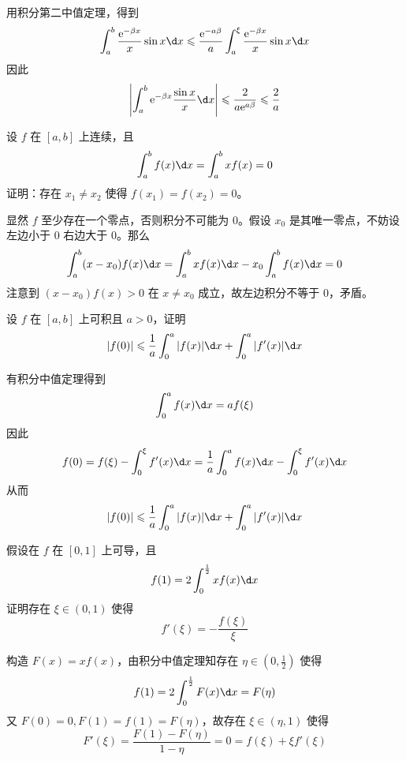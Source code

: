 \begin{solution}
	用积分第二中值定理，得到
	\[ \int_{a}^{b} \frac{\ee^{-\beta x}}{x} \sin x \d x \leqslant \frac{\ee^{-a \beta}}{a} \int_{a}^{\xi} \frac{\ee^{-\beta x}}{x} \sin x \d x \]
	因此
	\[ \left| \int_{a}^{b} \ee^{-\beta x} \frac{\sin x}{x} \d x \right| \leqslant \frac{2}{a \ee^{a \beta}} \leqslant \frac{2}{a} \]
\end{solution}

\begin{problem}[000045]
设 $f$ 在 $[a, b]$ 上连续，且
\[ \int_{a}^{b} f(x) \d x = \int_{a}^{b} x f(x) = 0 \]
证明：存在 $x_1 \neq x_2$ 使得 $f(x_1) = f(x_2) = 0$。
\end{problem}

\begin{solution}
	显然 $f$ 至少存在一个零点，否则积分不可能为 $0$。假设 $x_0$ 是其唯一零点，不妨设左边小于 $0$ 右边大于 $0$。那么
	\[ \int_{a}^{b} (x - x_0) f(x) \d x = \int_{a}^{b} x f(x) \d x - x_0 \int_{a}^{b} f(x) \d x = 0 \]
	注意到 $(x - x_0) f(x) > 0$ 在 $x \neq x_0$ 成立，故左边积分不等于 $0$，矛盾。
\end{solution}

\begin{problem}[000046]
设 $f$ 在 $[a, b]$ 上可积且 $a > 0$，证明
\[ |f(0)| \leqslant \frac{1}{a} \int_{0}^{a} |f(x)| \d x + \int_{0}^{a} |f'(x)| \d x \]
\end{problem}

\begin{solution}
	有积分中值定理得到
	\[ \int_{0}^{a} f(x) \d x = a f(\xi) \]
	因此
	\[ f(0) = f(\xi) - \int_{0}^{\xi} f'(x) \d x = \frac{1}{a} \int_{0}^{a} f(x) \d x - \int_{0}^{\xi} f'(x) \d x \]
	从而
	\[ |f(0)| \leqslant \frac{1}{a} \int_{0}^{a} |f(x)| \d x + \int_{0}^{a} |f'(x)| \d x \]
\end{solution}

\begin{problem}[000047]
假设在 $f$ 在 $[0, 1]$ 上可导，且
\[ f(1) = 2 \int_{0}^{\frac{1}{2}} x f(x) \d x \]
证明存在 $\xi \in (0, 1)$ 使得
\[ f'(\xi) = -\frac{f(\xi)}{\xi} \]
\end{problem}

\begin{solution}
	构造 $F(x) = x f(x)$，由积分中值定理知存在 $\eta \in (0, \frac{1}{2})$ 使得
	\[ f(1) = 2\int_{0}^{\frac{1}{2}} F(x) \d x = F(\eta) \]
	又 $F(0) = 0, F(1) = f(1) = F(\eta)$，故存在 $\xi \in (\eta, 1)$ 使得
	\[ F'(\xi) = \frac{F(1) - F(\eta)}{1 - \eta} = 0 = f(\xi) + \xi f'(\xi) \]
\end{solution}

